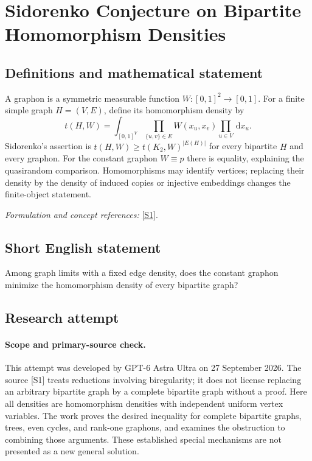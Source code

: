 \documentclass[11pt]{article}
\begin{document}
\section*{\texorpdfstring{Sidorenko Conjecture on Bipartite Homomorphism Densities}{Sidorenko Conjecture on Bipartite Homomorphism Densities}}\label{265}
\subsection{Definitions and mathematical statement}
A graphon is a symmetric measurable function $W:[0,1]^2\to[0,1]$. For a finite simple graph $H=(V,E)$, define its homomorphism density by
\[
 t(H,W)=\int_{[0,1]^{V}}\prod_{\{u,v\}\in E}W(x_u,x_v)\prod_{u\in V}{\,\mathrm{d}} x_u.
\]
Sidorenko's assertion is
$t(H,W)\ge t(K_2,W)^{|E(H)|}$ for every bipartite $H$ and every graphon. For the constant graphon $W\equiv p$ there is equality, explaining the quasirandom comparison. Homomorphisms may identify vertices; replacing their density by the density of induced copies or injective embeddings changes the finite-object statement.
\par\smallskip\textit{Formulation and concept references:} \href{https://arxiv.org/pdf/2108.06599}{[S1]}.

\subsection{Short English statement}
Among graph limits with a fixed edge density, does the constant graphon minimize the homomorphism density of every bipartite graph?
\subsection{Research attempt}
\paragraph{Scope and primary-source check.}
This attempt was developed by GPT-6 Astra Ultra on 27 September 2026.
The source [S1] treats reductions involving biregularity; it does not
license replacing an arbitrary bipartite graph by a complete bipartite
graph without a proof. Here all densities are homomorphism densities
with independent uniform vertex variables. The work proves the desired
inequality for complete bipartite graphs, trees, even cycles, and rank-one
graphons, and examines the obstruction to combining those arguments.
These established special mechanisms are not presented as a new general
solution.
\end{document}
